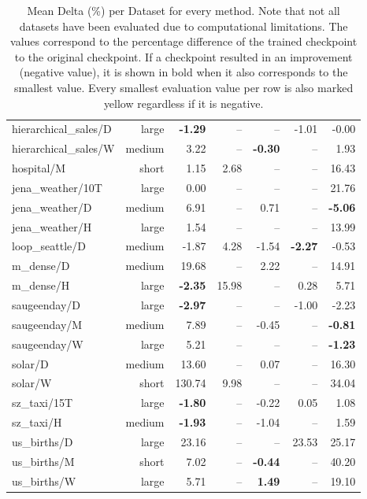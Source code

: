 \begin{table}[H]
\begin{tabular}{lrrrrrr}
        hierarchical\_sales/D & large & \cellcolor{yellow}\textbf{-1.29} & -- & -- & -1.01 & -0.00 \\
        hierarchical\_sales/W & medium & 3.22 & -- & \cellcolor{yellow}\textbf{-0.30} & -- & 1.93 \\
        hospital/M & short & \cellcolor{yellow}1.15 & 2.68 & -- & -- & 16.43 \\
        jena\_weather/10T & large & \cellcolor{yellow}0.00 & -- & -- & -- & 21.76 \\
        jena\_weather/D & medium & 6.91 & -- & 0.71 & -- & \cellcolor{yellow}\textbf{-5.06} \\
        jena\_weather/H & large & \cellcolor{yellow}1.54 & -- & -- & -- & 13.99 \\
        loop\_seattle/D & medium & -1.87 & 4.28 & -1.54 & \cellcolor{yellow}\textbf{-2.27} & -0.53 \\
        m\_dense/D & medium & 19.68 & -- & \cellcolor{yellow}2.22 & -- & 14.91 \\
        m\_dense/H & large & \cellcolor{yellow}\textbf{-2.35} & 15.98 & -- & 0.28 & 5.71 \\
        saugeenday/D & large & \cellcolor{yellow}\textbf{-2.97} & -- & -- & -1.00 & -2.23 \\
        saugeenday/M & medium & 7.89 & -- & -0.45 & -- & \cellcolor{yellow}\textbf{-0.81} \\
        saugeenday/W & large & 5.21 & -- & -- & -- & \cellcolor{yellow}\textbf{-1.23} \\
        solar/D & medium & 13.60 & -- & \cellcolor{yellow}0.07 & -- & 16.30 \\
        solar/W & short & 130.74 & \cellcolor{yellow}9.98 & -- & -- & 34.04 \\
        sz\_taxi/15T & large & \cellcolor{yellow}\textbf{-1.80} & -- & -0.22 & 0.05 & 1.08 \\
        sz\_taxi/H & medium & \cellcolor{yellow}\textbf{-1.93} & -- & -1.04 & -- & 1.59 \\
        us\_births/D & large & \cellcolor{yellow}23.16 & -- & -- & 23.53 & 25.17 \\
        us\_births/M & short & 7.02 & -- & \cellcolor{yellow}\textbf{-0.44} & -- & 40.20 \\
        us\_births/W & large & 5.71 & -- & \cellcolor{yellow}\textbf{1.49} & -- & 19.10 \\
        \bottomrule
    \end{tabular}
    \caption{Mean Delta (\%) per Dataset for every method. Note that not all datasets have been evaluated due to computational limitations. The values correspond to the percentage difference of the trained checkpoint to the original checkpoint. If a checkpoint resulted in an improvement (negative value), it is shown in bold when it also corresponds to the smallest value. Every smallest evaluation value per row is also marked yellow regardless if it is negative. }
    \label{tab:main_results_all_methods}
\end{table}


